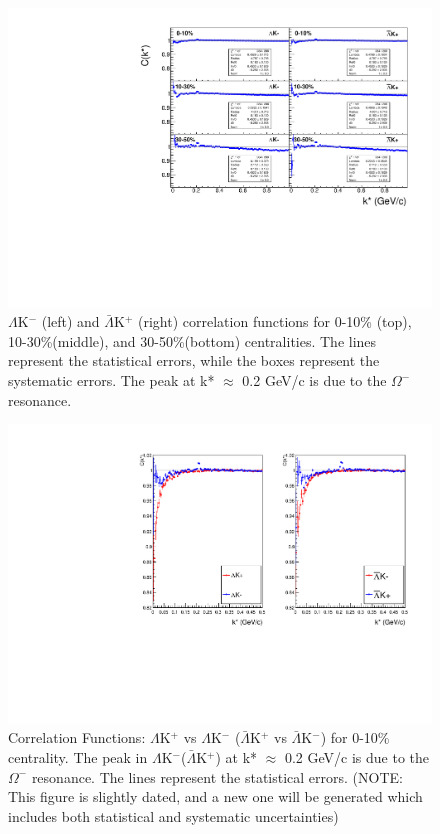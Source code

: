 \documentclass[../AnalysisNoteJBuxton.tex]{subfiles}
\begin{document}
\begin{figure}[h]
  \centering
  \includegraphics[width=\textwidth]{4_CorrelationFunctions/Figures/canKStarCfsLamKchMwConj.pdf}
  \caption[$\Lambda$K$^{-}$ and $\bar{\Lambda}$K$^{+}$ Correlation Functions]{$\Lambda$K$^{-}$ (left) and $\bar{\Lambda}$K$^{+}$ (right) correlation functions for 0-10\% (top), 10-30\%(middle), and 30-50\%(bottom) centralities.  The lines represent the statistical errors, while the boxes represent the systematic errors.  The peak at k* $\approx$ 0.2 GeV/c is due to the $\Omega^{-}$ resonance.}
  \label{fig:LamKchMwConjCfs}
\end{figure}

\begin{figure}[h]
  \centering
  \includegraphics[width=\textwidth]{4_CorrelationFunctions/Figures/canKStarCfLamKchP_0010.pdf}
  \caption[Correlation Functions: $\Lambda$K$^{+}$ vs $\Lambda$K$^{-}$ for 0-10\% Centrality]{Correlation Functions: $\Lambda$K$^{+}$ vs $\Lambda$K$^{-}$ ($\bar{\Lambda}$K$^{+}$ vs $\bar{\Lambda}$K$^{-}$) for 0-10\% centrality.  The peak in $\Lambda$K$^{-}$($\bar{\Lambda}$K$^{+}$) at k* $\approx$ 0.2 GeV/c is due to the $\Omega^{-}$ resonance.  The lines represent the statistical errors. (NOTE: This figure is slightly dated, and a new one will be generated which includes both statistical and systematic uncertainties)}
  \label{fig:cLamcKchCfs0010}
\end{figure}
\end{document}
